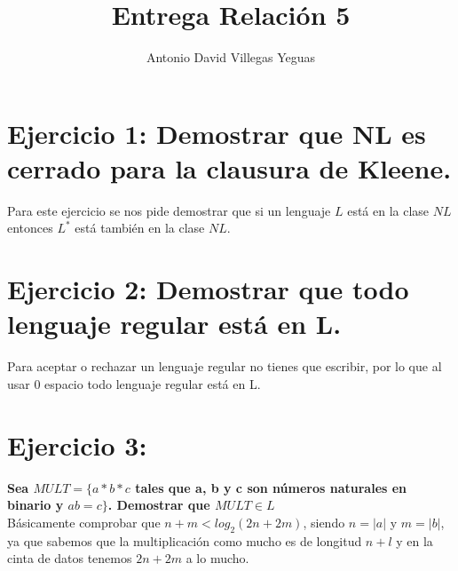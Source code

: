 \documentclass{article}
\title{Entrega Relación 5}
\author{Antonio David Villegas Yeguas}
\date{}
\begin{document}
\maketitle


\section*{Ejercicio 1: Demostrar que NL es cerrado para la clausura de Kleene.}

Para este ejercicio se nos pide demostrar que si un lenguaje $L$ está en la clase $NL$ entonces $L^*$ está también en la clase $NL$.

\section*{Ejercicio 2: Demostrar que todo lenguaje regular está en L.}

Para aceptar o rechazar un lenguaje regular no tienes que escribir, por lo que al usar 0 espacio todo lenguaje regular está en L.

\section*{Ejercicio 3:}

\Large{\textbf{Sea $MULT = \{a * b * c$ tales que a, b y c son números naturales en binario y $a  b = c\}$. Demostrar que $MULT \in L$}}
\\

\normalsize
Básicamente comprobar que $n + m < log_2(2n + 2m)$, siendo $n = |a|$ y $m = |b|$, ya que sabemos que la multiplicación como mucho es de longitud $n + l$ y en la cinta de datos tenemos $2n + 2m$ a lo mucho.
\end{document}
